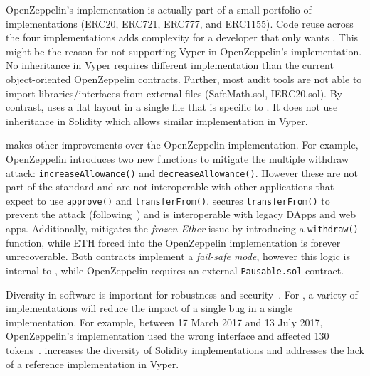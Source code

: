 OpenZeppelin's implementation is actually part of a small portfolio of implementations (ERC20, ERC721, ERC777, and ERC1155). Code reuse across the four implementations adds complexity for a developer that only wants \erc. This might be the reason for not supporting Vyper in OpenZeppelin's implementation. No inheritance in Vyper requires different implementation than the current object-oriented OpenZeppelin contracts. Further, most audit tools are not able to import libraries/interfaces from external files (\eg SafeMath.sol, IERC20.sol). By contrast, \sys uses a flat layout in a single file that is specific to \erc. It does not use inheritance in Solidity which allows similar implementation in Vyper.  


\sys makes other improvements over the OpenZeppelin implementation. For example, OpenZeppelin introduces two new functions to mitigate the multiple withdraw attack: \texttt{increaseAllowance()} and \texttt{decreaseAllowance()}. However these are not part of the \erc standard and are not  interoperable with other applications that expect to use \texttt{approve()} and \texttt{transferFrom()}. \sys secures \texttt{transferFrom()} to prevent the attack (following~\cite{ERC20MWA}) and is interoperable with legacy DApps and web apps. Additionally, \sys mitigates the \textit{frozen Ether} issue by introducing a \texttt{withdraw()} function, while ETH forced into the OpenZeppelin implementation is forever unrecoverable. Both contracts implement a \textit{fail-safe mode}, however this logic is internal to \sys, while OpenZeppelin requires an external \texttt{Pausable.sol} contract.

Diversity in software is important for robustness and security~\cite{FSA97,FHS97}. For \erc, a variety of implementations will reduce the impact of a single bug in a single implementation. For example, between 17 March 2017 and 13 July 2017, OpenZeppelin's implementation used the wrong interface and affected 130 tokens~\cite{ErcBug}. \sys increases the diversity of \erc Solidity implementations and addresses the lack of a reference implementation in Vyper.

